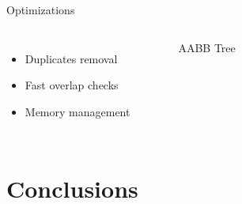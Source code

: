\documentclass{beamer}
\begin{document}
    \begin{frame}{Optimizations}
        \begin{columns}[onlytextwidth,T]
        \column{\dimexpr\linewidth-65mm-5mm}
            \begin{itemize}
                \item Duplicates removal
                \item Fast overlap checks
                \item Memory management
            \end{itemize}
        \column{65mm}
            \begin{figure}[h]
                \resizebox*{\columnwidth}{!}{%
                
                }
                \caption{AABB Tree}
            \end{figure}
        \end{columns}
    \end{frame}

    \section{Conclusions}
\end{document}
